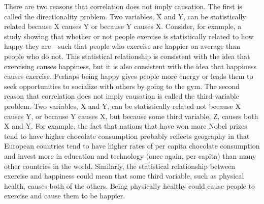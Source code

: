  There are two reasons that correlation does not imply causation. The first is called the directionality problem. Two variables, X and Y, can be statistically related because X causes Y or because Y causes X. Consider, for example, a study showing that whether or not people exercise is statistically related to how happy they are---such that people who exercise are happier on average than people who do not. This statistical relationship is consistent with the idea that exercising causes happiness, but it is also consistent with the idea that happiness causes exercise. Perhaps being happy gives people more energy or leads them to seek opportunities to socialize with others by going to the gym. The second reason that correlation does not imply causation is called the third-variable problem. Two variables, X and Y, can be statistically related not because X causes Y, or because Y causes X, but because some third variable, Z, causes both X and Y. For example, the fact that nations that have won more Nobel prizes tend to have higher chocolate consumption probably reflects geography in that European countries tend to have higher rates of per capita chocolate consumption and invest more in education and technology (once again, per capita) than many other countries in the world. Similarly, the statistical relationship between exercise and happiness could mean that some third variable, such as physical health, causes both of the others. Being physically healthy could cause people to exercise and cause them to be happier.

